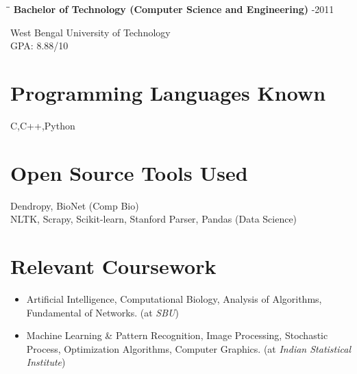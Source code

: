 \documentclass{res}
\begin{document}
\begin{resume}
\vspace{-0.1in}	
\begin{tabbing}
\hspace{2.3in}\= \hspace{2.6in}\= \kill %
{\bf Bachelor of Technology (Computer Science and Engineering)}  \>     -2011
\end{tabbing}  \vspace{-20pt}      %
West Bengal University of Technology     \\       
GPA: 8.88/10      \\   

\section{Programming Languages Known}
C,C++,Python

\section{\bf Open Source Tools Used}
Dendropy, BioNet  (Comp Bio) \\
NLTK, Scrapy, Scikit-learn, Stanford Parser, Pandas (Data Science) \\

\section{Relevant Coursework} 
\begin{itemize}
\item Artificial Intelligence,  Computational Biology, Analysis of Algorithms, Fundamental of Networks. (at {\it SBU})
\item Machine Learning \& Pattern Recognition, Image Processing, Stochastic Process, Optimization Algorithms, Computer Graphics. (at {\it
Indian Statistical Institute})
\end{itemize}



\end{resume}
\end{document}
